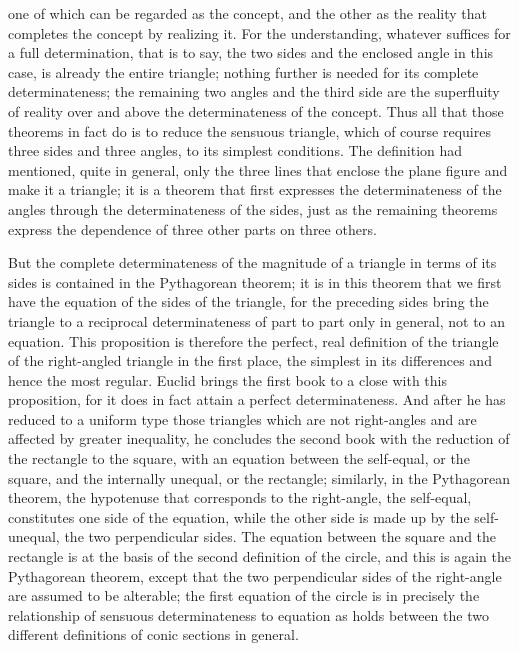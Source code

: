 one of which can be regarded as the concept,
and the other as the reality
that completes the concept by realizing it.
For the understanding, whatever suffices for a full determination,
that is to say, the two sides and the enclosed angle in this case,
is already the entire triangle;
nothing further is needed for its complete determinateness;
the remaining two angles and the third side are
the superfluity of reality over and above
the determinateness of the concept.
Thus all that those theorems in fact do is
to reduce the sensuous triangle,
which of course requires
three sides and three angles,
to its simplest conditions.
The definition had mentioned,
quite in general,
only the three lines that enclose the plane figure
and make it a triangle;
it is a theorem that first expresses
the determinateness of the angles
through the determinateness of the sides,
just as the remaining theorems express
the dependence of three other parts on three others.

But the complete determinateness of
the magnitude of a triangle in terms of its sides
is contained in the Pythagorean theorem;
it is in this theorem that we first have
the equation of the sides of the triangle,
for the preceding sides bring the triangle
to a reciprocal determinateness of
part to part only in general, not to an equation.
This proposition is therefore the perfect,
real definition of the triangle
of the right-angled triangle in the first place,
the simplest in its differences and hence the most regular.
Euclid brings the first book to a close with this proposition,
for it does in fact attain a perfect determinateness.
And after he has reduced to a uniform type
those triangles which are not right-angles
and are affected by greater inequality,
he concludes the second book with
the reduction of the rectangle to the square,
with an equation between the self-equal, or the square,
and the internally unequal, or the rectangle;
similarly, in the Pythagorean theorem,
the hypotenuse that corresponds to the right-angle, the self-equal,
constitutes one side of the equation,
while the other side is made up by the self-unequal,
the two perpendicular sides.
The equation between the square and the rectangle is
at the basis of the second definition of the circle,
and this is again the Pythagorean theorem,
except that the two perpendicular sides of
the right-angle are assumed to be alterable;
the first equation of the circle is in precisely
the relationship of sensuous determinateness to
equation as holds between the two different
definitions of conic sections in general.

